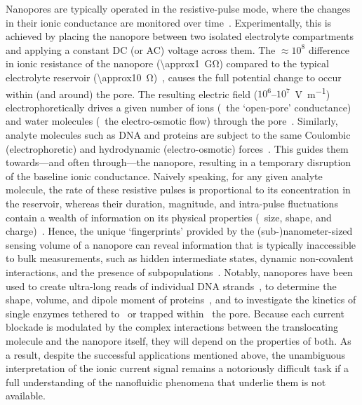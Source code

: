 Nanopores are typically operated in the resistive-pulse mode, where the changes in their ionic conductance are
monitored over time~\cite{Bayley-2001,Dekker-2007,Maglia-2010,Venkatesan-2011}. Experimentally, this is
achieved by placing the nanopore between two isolated electrolyte compartments and applying a constant DC (or
AC) voltage across them. The $\approx10^8$ difference in ionic resistance of the nanopore
(\SI{\approx1}{\giga\ohm}) compared to the typical electrolyte reservoir
(\SI{\approx10}{\ohm})~\cite{Maglia-2010}, causes the full potential change to occur within (and around) the
pore. The resulting electric field ($10^6$--$10^7$~\si{\V\per\m}) electrophoretically drives a given number of
ions (\ie~the `open-pore' conductance) and water molecules (\ie~the electro-osmotic flow) through the
pore~\cite{Wong-2007,Mao-2014,Haywood-2014,Laohakunakorn-2015}. Similarly, analyte molecules such as DNA and
proteins are subject to the same Coulombic (electrophoretic) and hydrodynamic (electro-osmotic)
forces~\cite{Wong-2007,Grosberg-2010,Muthukumar-2010,Muthukumar-2014}. This guides them towards---and often
through---the nanopore, resulting in a temporary disruption of the baseline ionic conductance. Naively
speaking, for any given analyte molecule, the rate of these resistive pulses is proportional to its
concentration in the reservoir, whereas their duration, magnitude, and intra-pulse fluctuations contain a
wealth of information on its physical properties (\eg~size, shape, and
charge)~\cite{Howorka-2009,Ying-2019,Lu-2020}. Hence, the unique `fingerprints' provided by the
(sub-)nanometer-sized sensing volume of a nanopore can reveal information that is typically inaccessible to
bulk measurements, such as hidden intermediate states, dynamic non-covalent interactions, and the presence of
subpopulations~\cite{Ying-2019,Lu-2020}. Notably, nanopores have been used to create ultra-long reads of
individual DNA strands~\cite{Jain-2018}, to determine the shape, volume, and dipole moment of
proteins~\cite{Yusko-2017,Houghtaling-2019}, and to investigate the kinetics of single enzymes tethered
to~\cite{Derrington-2015,Harrington-2019} or trapped within~\cite{Li-2020,Galenkamp-2020} the pore. Because
each current blockade is modulated by the complex interactions between the translocating molecule and the
nanopore itself, they will depend on the properties of both. As a result, despite the successful applications
mentioned above, the unambiguous interpretation of the ionic current signal remains a notoriously difficult
task if a full understanding of the nanofluidic phenomena that underlie them is not available.

